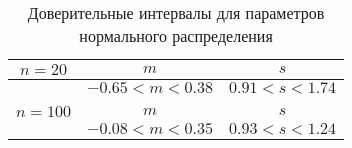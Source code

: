 \begin{table}[H]
    \centering
    \begin{tabular}{c|c|c}
        $n=20$ & $m$ & $s$ \\
        \hline
         & $-0.65 < m < 0.38$ & $0.91 < s < 1.74$ \\
        \multicolumn{3}{c}{} \\
        $n=100$ & $m$ & $s$ \\
        \hline
         & $-0.08 < m < 0.35$ & $0.93 < s < 1.24$ \\
    \end{tabular}
    \caption{Доверительные интервалы для параметров нормального распределения}
    \label{tab:interv_simple}
\end{table}